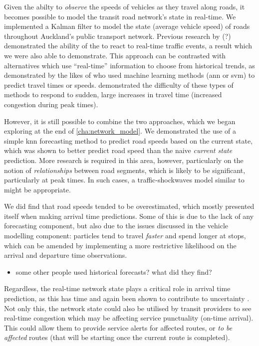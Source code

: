 Given the abilty to \emph{observe} the speeds of vehicles as they travel along roads, it becomes possible to model the transit road network's state in real-time. We implemented a Kalman filter to model the state (average vehicle speed) of roads throughout Auckland's public transport network. Previous research by \citet{Shalaby_2004}(?) demonstrated the ability of the \kf{} to react to real-time traffic events, a result which we were also able to demonstrate. This approach can be contrasted with alternatives which use ``real-time'' information to choose from historical trends, as demonstrated by the likes of \citet{Chen_2014,Julio_2016,Yu_2010,Yu_2011,Celan_2017} who used machine learning methods (\gls{ann} or \gls{svm}) to predict travel times or speeds.  demonstrated the difficulty of these types of methods to respond to sudden, large increases in travel time (increased congestion during peak times).


However, it is still possible to combine the two approaches, which we began exploring at the end of \cref{cha:network_model}. We demonstrated the use of a simple \gls{knn} forecasting method to predict road speeds based on the current state, which was shown to better predict road speed than the na\:ive \emph{current state} prediction. More research is required in this area, however, particularly on the notion of \emph{relationships} between road segments, which is likely to be significant, particularly at peak times. In such cases, a traffic-shockwaves model similar to \citet{Julio_2016} might be appropriate.


We did find that road speeds tended to be overestimated, which mostly presented itself when making arrival time predictions. Some of this is due to the lack of any forecasting component, but also due to the issues discussed in the vehicle modelling component: particles tend to travel \emph{faster} and spend longer at stops, which can be amended by implementing a more restrictive likelihood on the arrival and departure time observations.
\begin{itemize}
  \item some other people used historical forecasts? what did they find?
\end{itemize}


Regardless, the real-time network state plays a critical role in arrival time prediction, as this has time and again been shown to contribute to uncertainty \citep{Shalaby_2004,Yu_2006,Yu_2010,Yu_2011,Julio_2016}. Not only this, the network state could also be utilised by transit providers to see real-time congestion which may be affecting service punctuality (on-time arrival). This could allow them to provide service alerts for affected routes, or \emph{to be affected} routes (that will be starting once the current route is completed).


